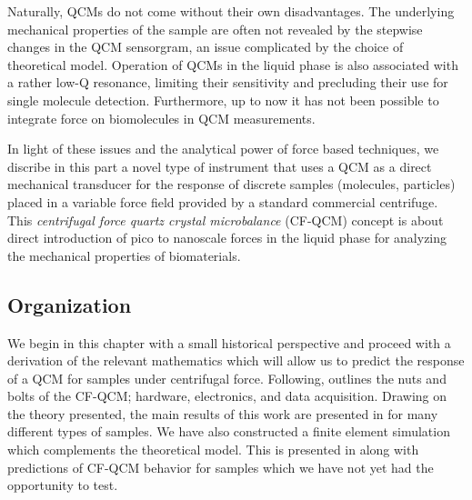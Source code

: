 Naturally, QCMs do not come without their own disadvantages. The underlying
mechanical properties of the sample are often not revealed by the stepwise
changes in the QCM sensorgram, an issue complicated by the choice of
theoretical model.  Operation of QCMs in the liquid phase is also
associated with a rather low-Q resonance, limiting their sensitivity and
precluding their use for single molecule detection.  Furthermore, up to now
it has not been possible to integrate force on biomolecules in QCM
measurements.

In light of these issues and the analytical power of force based
techniques, we discribe in this part a novel type of instrument that uses a
QCM as a direct mechanical transducer for the response of discrete samples
(molecules, particles) placed in a variable force field provided by a
standard commercial centrifuge.  This \textit{centrifugal force quartz
crystal microbalance} (CF-QCM) concept is about direct introduction of pico
to nanoscale forces in the liquid phase for analyzing the mechanical
properties of biomaterials.

\subsection{Organization}
We begin in this chapter with a small historical perspective and proceed
with a derivation of the relevant mathematics which will allow us to
predict the response of a QCM for samples under centrifugal force.
Following,  outlines the nuts and bolts of the
CF-QCM; hardware, electronics, and data acquisition.  Drawing on the theory
presented, the main results of this work are presented in
 for many different types of samples.  We have
also constructed a finite element simulation which complements the
theoretical model.  This is presented in  along
with predictions of CF-QCM behavior for samples which we have not yet had
the opportunity to test.
